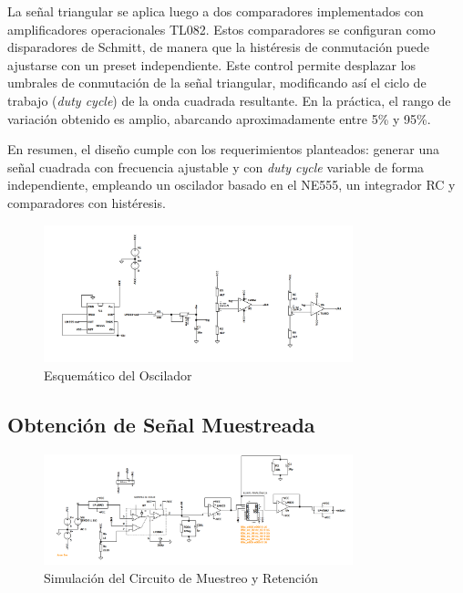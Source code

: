 La señal triangular se aplica luego a dos comparadores implementados con amplificadores operacionales TL082. Estos comparadores se configuran como disparadores de Schmitt, de manera que la histéresis de conmutación puede ajustarse con un preset independiente. Este control permite desplazar los umbrales de conmutación de la señal triangular, modificando así el ciclo de trabajo (\textit{duty cycle}) de la onda cuadrada resultante. En la práctica, el rango de variación obtenido es amplio, abarcando aproximadamente entre 5\% y 95\%.

En resumen, el diseño cumple con los requerimientos planteados: generar una señal cuadrada con frecuencia ajustable y con \textit{duty cycle} variable de forma independiente, empleando un oscilador basado en el NE555, un integrador RC y comparadores con histéresis.
\begin{figure}[H]
    \centering
    \includegraphics[width=0.8\textwidth]{Imagenes/esquematico_oscilador.png}
    \caption{Esquemático del Oscilador}
    \label{esquematico_oscilador}
\end{figure}

\subsection{Obtención de Señal Muestreada}

\begin{figure}[H]
    \centering
    \includegraphics[width=0.8\textwidth]{Imagenes/esquematico_gral.png}
    \caption{Simulación del Circuito de Muestreo y Retención}
    \label{fig:Simulacion_Sample_and_Hold}
\end{figure}

